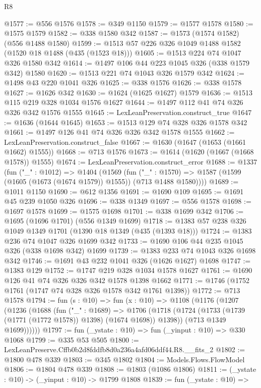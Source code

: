 \begin{lexlean}{R8}
\begin{coremodule}
@1577 := @556 @1576
@1578 := @349 @1150
@1579 := @1577 @1578
@1580 := @1575 @1579
@1582 := @338 @1580 @342
@1587 := @1573 (@1574 @1582) (@556 @1488 @1580)
@1599 := @1513 @57 @226 @326 @1049 @1488 @1582 (@1520 @18 @1488 (@435 (@1523 @18)))
@1605 := @1513 @224 @74 @1047 @326 @1580 @342
@1614 := @1497 @106 @44 @223 @1045 @326 (@338 @1579 @342) @1580
@1620 := @1513 @221 @74 @1043 @326 @1579 @342
@1624 := @1498 @43 @220 @1041 @326
@1625 := @338 @1576
@1626 := @338 @1578
@1627 := @1626 @342
@1630 := @1624 (@1625 @1627) @1579
@1636 := @1513 @115 @219 @328 @1034 @1576 @1627
@1644 := @1497 @112 @41 @74 @326 @326 @342 @1576 @1555
@1645 := LexLeanPreservation.construct_true
@1647 := @1636 (@1644 @1645)
@1653 := @1513 @129 @74 @328 @326 @1578 @342
@1661 := @1497 @126 @41 @74 @326 @326 @342 @1578 @1555
@1662 := LexLeanPreservation.construct_false
@1667 := @1630 (@1647 (@1653 (@1661 @1662) @1555))
@1668 := @713 @1576
@1673 := @1614 (@1620 (@1667 (@1668 @1578)) @1555)
@1674 := LexLeanPreservation.construct_error
@1688 := @1337
    (fun ("_" : @1012) =>
    @1404
      (@1569
        (fun ("_" : @1570) =>
        @1587 (@1599 (@1605 (@1673 (@1674 @1579)) @1555)) (@713 @1488 @1580))))
@1689 := @1011 @1150
@1690 := @612 @1356
@1691 := @1690 @109
@1695 := @1691 @45 @239 @1050 @326
@1696 := @338 @1349
@1697 := @556 @1578
@1698 := @1697 @1578
@1699 := @1575 @1698
@1701 := @338 @1699 @342
@1706 := @1695 (@1696 @1701) (@556 @1349 @1699)
@1718 := @1383 @57 @238 @326 @1049 @1349 @1701 (@1390 @18 @1349 (@435 (@1393 @18)))
@1724 := @1383 @236 @74 @1047 @326 @1699 @342
@1733 := @1690 @106 @44 @235 @1045 @326 (@338 @1698 @342) @1699
@1739 := @1383 @233 @74 @1043 @326 @1698 @342
@1746 := @1691 @43 @232 @1041 @326 (@1626 @1627) @1698
@1747 := @1383 @129
@1752 := @1747 @219 @328 @1034 @1578 @1627
@1761 := @1690 @126 @41 @74 @326 @326 @342 @1578 @1398 @1662
@1771 := @1746 (@1752 @1761 (@1747 @74 @328 @326 @1578 @342 @1761 @1398))
@1772 := @713 @1578
@1794 := fun (s : @10) =>
  fun (x : @10) =>
  @1108
    (@1176
      (@1207
        (@1236
          (@1688
            (fun ("_" : @1689) =>
            @1706
              (@1718 (@1724 (@1733 (@1739 (@1771 (@1772 @1578)) @1398) (@1674 @1698)) @1398))
              (@713 @1349 @1699))))))
@1797 := fun (_ystate : @10) => fun (_yinput : @10) => @330 @1068
@1799 := @335 @53 @505
@1800 := LexLeanPreserve.Cffb0b2d8fddfb8d0a236a4afd06ddf44.R8.__fits_2
@1802 := @1800 @478 @339
@1803 := @345 @1802
@1804 := Models.Flows.FlowModel
@1806 := @1804 @478 @339
@1808 := @1803 (@1086 @1806)
@1811 := (_ystate : @10) -> (_yinput : @10) -> @1799 @1808
@1839 := fun (_ystate : @10) =>

\end{coremodule}
\end{lexlean}
